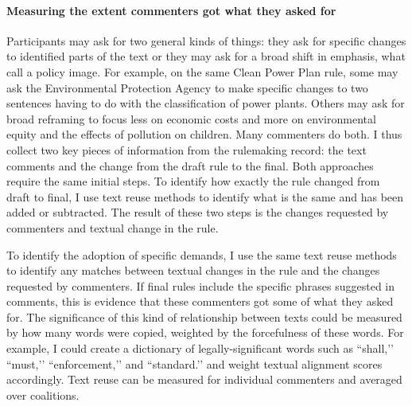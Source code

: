 \paragraph{Measuring the extent commenters got what they asked for}

Participants may ask for two general kinds of things: they ask for specific changes to identified parts of the text or they may ask for a broad shift in emphasis, what \citet{Jones2005} call a policy image. For example, on the same Clean Power Plan rule, some may ask the Environmental Protection Agency to make specific changes to two sentences having to do with the classification of power plants.%
Others may ask for broad reframing to focus less on economic costs and more on environmental equity and the effects of pollution on children. Many commenters do both. 
I thus collect two key pieces of information from the rulemaking record: the text comments and the change from the draft rule to the final. %
Both approaches require the same initial steps. To identify how exactly the rule changed from draft to final, I use text reuse methods to identify what is the same and has been added or subtracted. 
The result of these two steps is the changes requested by commenters and textual change in the rule. 

To identify the adoption of specific demands, I use the same text reuse methods to identify any matches between textual changes in the rule and the changes requested by commenters. If final rules include the specific phrases suggested in comments, this is evidence that these commenters got some of what they asked for. The significance of this kind of relationship between texts could be measured by how many words were copied, weighted by the forcefulness of these words. For example, I could create a dictionary of legally-significant words such as ``shall,’’ ``must,’’ ``enforcement,’’ and ``standard.’’ and weight textual alignment scores accordingly. Text reuse can be measured for individual commenters and averaged over coalitions. 

